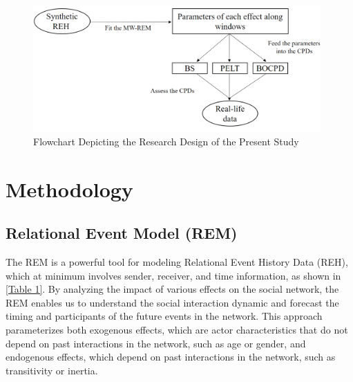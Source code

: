 \documentclass[]{interact}
\theoremstyle{plain}%
\theoremstyle{definition}
\theoremstyle{remark}
\begin{document}
{    \begin{figure}[h]
    	\captionsetup{justification=raggedright}
    	\renewcommand{\figurename}{Figure}
    	\centering
    	\includegraphics[width=11cm]{Flow_whole}
    	\caption{\fontsize{8}{10}\selectfont Flowchart Depicting the Research Design of the Present Study}
    	\label{Figure 1}
    \end{figure}
	
	\section{\fontsize{14}{15}\selectfont Methodology}
	
	\subsection{Relational Event Model (REM)}
	
	\hspace{0.28cm} The REM is a powerful tool for modeling Relational Event History Data (REH), which at minimum involves sender, receiver, and time information, as shown in \autoref{Table 1}. By analyzing the impact of various effects on the social network, the REM enables us to understand the social interaction dynamic and forecast the timing and participants of the future events in the network. This approach parameterizes both exogenous effects, which are actor characteristics that do not depend on past interactions in the network, such as age or gender, and endogenous effects, which depend on past interactions in the network, such as transitivity or inertia. \\
	
}
\end{document}
